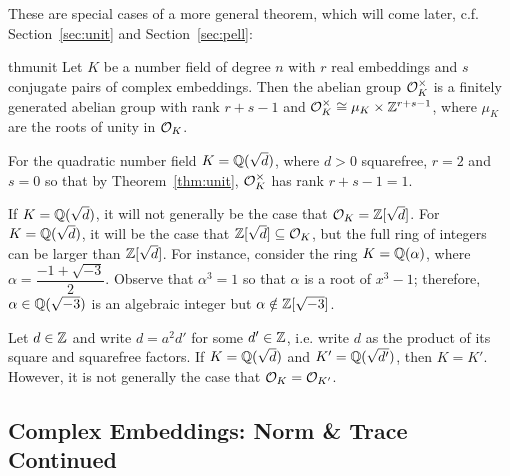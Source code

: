 These are special cases of a more general theorem, which will come later, c.f. Section~\ref{sec:unit} and Section~\ref{sec:pell}: 


\begin{restatable*}{thm}{unit} \label{thm:unit}
Let $K$ be a number field of degree $n$ with $r$ real embeddings and $s$ conjugate pairs of complex embeddings. Then the abelian group $\mathcal{O}_K^\times$ is a finitely generated abelian group with rank $r+s-1$ and $\mathcal{O}_K^\times \cong \mu_K \times \mathbb{Z}^{r+s-1}$, where $\mu_K$ are the roots of unity in $\mathcal{O}_K$. 
\end{restatable*}


\begin{ex}
For the quadratic number field $K= \mathbb{Q}(\sqrt{d})$, where $d>0$ squarefree, $r= 2$ and $s= 0$ so that by Theorem~\ref{thm:unit}, $\mathcal{O}_K^\times$ has rank $r + s - 1= 1$. \xqed \pskip
\end{ex}


\begin{rem} \label{rem:roint_larger}
If $K= \mathbb{Q}(\sqrt{d})$, it will not generally be the case that $\mathcal{O}_K= \mathbb{Z}[\sqrt{d}]$. For $K= \mathbb{Q}(\sqrt{d})$, it will be the case that $\mathbb{Z}[\sqrt{d}] \subseteq \mathcal{O}_K$, but the full ring of integers can be larger than $\mathbb{Z}[\sqrt{d}]$. For instance, consider the ring $K= \mathbb{Q}(\alpha)$, where $\alpha= \dfrac{-1 + \sqrt{-3}}{2}$. Observe that $\alpha^3= 1$ so that $\alpha$ is a root of $x^3 - 1$; therefore, $\alpha \in \mathbb{Q}(\sqrt{-3})$ is an algebraic integer but $\alpha \notin \mathbb{Z}[\sqrt{-3}]$.
\end{rem}


\begin{rem}
Let $d \in \mathbb{Z}$ and write $d= a^2 d'$ for some $d' \in \mathbb{Z}$, i.e. write $d$ as the product of its square and squarefree factors. If $K= \mathbb{Q}(\sqrt{d})$ and $K'= \mathbb{Q}(\sqrt{d'})$, then $K= K'$. However, it is not generally the case that $\mathcal{O}_K= \mathcal{O}_{K'}$. 
\end{rem}



\subsection{Complex Embeddings: Norm \& Trace Continued}

